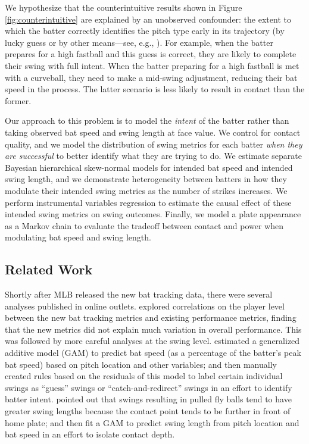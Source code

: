 \documentclass{article}
\begin{document}
    We hypothesize that the counterintuitive results shown in Figure \ref{fig:counterintuitive} are explained by an unobserved confounder: the extent to which the batter correctly identifies the pitch type early in its trajectory (by lucky guess or by other means---see, e.g., \textcite{elmore_bang_2022}). For example, when the batter prepares for a high fastball and this guess is correct, they are likely to complete their swing with full intent. When the batter preparing for a high fastball is met with a curveball, they need to make a mid-swing adjustment, reducing their bat speed in the process. The latter scenario is less likely to result in contact than the former.

    Our approach to this problem is to model the {\it intent} of the batter rather than taking observed bat speed and swing length at face value. We control for contact quality, and we model the distribution of swing metrics for each batter {\it when they are successful} to better identify what they are trying to do. We estimate separate Bayesian hierarchical skew-normal models for intended bat speed and intended swing length, and we demonstrate heterogeneity between batters in how they modulate their intended swing metrics as the number of strikes increases. We perform instrumental variables regression to estimate the causal effect of these intended swing metrics on swing outcomes. Finally, we model a plate appearance as a Markov chain to evaluate the tradeoff between contact and power when modulating bat speed and swing length.

    \subsection{Related Work}
    \label{sec:related-work}

      Shortly after MLB released the new bat tracking data, there were several analyses published in online outlets. \textcite{clemens_what_2024} explored correlations on the player level between the new bat tracking metrics and existing performance metrics, finding that the new metrics did not explain much variation in overall performance. This was followed by more careful analyses at the swing level. \textcite{woodward_radar_2024} estimated a generalized additive model (GAM) to predict bat speed (as a percentage of the batter's peak bat speed) based on pitch location and other variables; and then manually created rules based on the residuals of this model to label certain individual swings as ``guess'' swings or ``catch-and-redirect'' swings in an effort to identify batter intent. \textcite{orr_defense_2024} pointed out that swings resulting in pulled fly balls tend to have greater swing lengths because the contact point tends to be further in front of home plate; and then fit a GAM to predict swing length from pitch location and bat speed in an effort to isolate contact depth.
\end{document}
